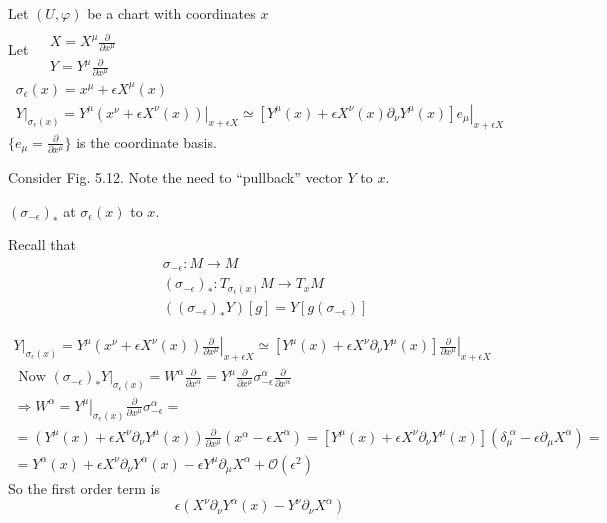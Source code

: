 \documentclass{book}
\begin{document}
Let $(U, \varphi)$ be a chart with coordinates $x$ \\
Let $ \begin{aligned} & \quad \\ 
  & X = X^{\mu} \frac{ \partial }{ \partial x^{\mu } } \\
  & Y = Y^{\mu} \frac{ \partial }{ \partial x^{\mu} } \end{aligned}$   
\[
\begin{gathered}
  \sigma_{ \epsilon}(x) = x^{\mu} +  \epsilon X^{\mu}(x) \\ 
  \left. Y \right|_{ \sigma_{\epsilon }(x) } = \left. Y^{\mu}(x^{\nu} + \epsilon X^{\nu}(x)) \right|_{x + \epsilon X} \simeq \left. \left[ Y^{\mu}(x) + \epsilon X^{\nu}(x) \partial_{\nu} Y^{\mu }(x) \right] e_{\mu} \right|_{x + \epsilon X}
\end{gathered}
\]
$\lbrace e_{\mu} = \frac{ \partial }{ \partial x^{\mu} } \rbrace$ is the coordinate basis.  

Consider Fig. 5.12.  Note the need to ``pullback'' vector $Y$ to $x$.  


$(\sigma_{-\epsilon})_*$ at $\sigma_{\epsilon}(x)$ to $x$.  

Recall that 
\[
\begin{aligned}
  & \sigma_{-\epsilon} : M \to M \\ 
  & (\sigma_{- \epsilon})_* : T_{ \sigma_{\epsilon}(x) } M \to T_x M \\ 
  & ((\sigma_{-\epsilon})_* Y)[g] = Y[g(\sigma_{-\epsilon }) ] 
\end{aligned}
\]

\[
\begin{gathered}
  \left. Y \right|_{ \sigma_{\epsilon}(x) } = \left. Y^{\mu} (x^{\nu} + \epsilon X^{\nu}(x) ) \frac{ \partial }{ \partial x^{\mu} } \right|_{x + \epsilon X} \simeq \left. \left[ Y^{\mu}(x) + \epsilon X^{\nu} \partial_{\nu} Y^{\mu}(x) \right] \frac{ \partial }{ \partial x^{\mu} } \right|_{x + \epsilon X } \\ 
    \text{ Now } \left. (\sigma_{-\epsilon})_* Y \right|_{ \sigma_{\epsilon}(x) } = W^{\alpha} \frac{ \partial }{ \partial x^{\alpha }} = Y^{\mu} \frac{ \partial }{ \partial x^{\mu}} \sigma_{-\epsilon}^{\alpha} \frac{ \partial }{ \partial x^{\alpha }} \\
    \Longrightarrow W^{\alpha} =\left.  Y^{\mu}  \right|_{ \sigma_{\epsilon}(x) } \frac{ \partial }{ \partial x^{\mu }} \sigma^{\alpha}_{-\epsilon } = \\
    = (Y^{\mu}(x) + \epsilon X^{\nu} \partial_{\nu} Y^{\mu}(x)) \frac{ \partial }{ \partial x^{\mu} } (x^{\alpha}  - \epsilon X^{\alpha} ) = [ Y^{\mu}(x) + \epsilon X^{\nu} \partial_{\nu} Y^{\mu}(x)] ( \delta_{\mu}^{ \, \, \alpha} - \epsilon \partial_{\mu} X^{\alpha} ) = \\
    = Y^{\alpha}(x) + \epsilon X^{\nu} \partial_{\nu} Y^{\alpha}(x) - \epsilon Y^{\mu} \partial_{\mu} X^{\alpha} + \mathcal{O}(\epsilon^2 ) 
\end{gathered} 
\]
So the first order term is 
\[
\epsilon (X^{\nu} \partial_{\nu} Y^{ \alpha}(x) - Y^{\nu} \partial_{\nu} X^{\alpha} )
\]
\end{document}
